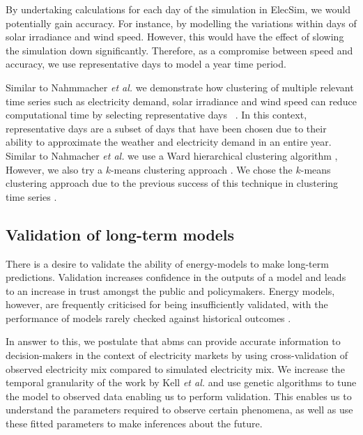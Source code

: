 By undertaking calculations for each day of the simulation in ElecSim, we would potentially gain accuracy. For instance, by modelling the variations within days of solar irradiance and wind speed. However, this would have the effect of slowing the simulation down significantly. Therefore, as a compromise between speed and accuracy, we use representative days to model a year time period. 

Similar to Nahmmacher \textit{et al.} we demonstrate how clustering of multiple relevant time series such as electricity demand, solar irradiance and wind speed can reduce computational time by selecting representative days ~\cite{Nahmmacher2016}. In this context, representative days are a subset of days that have been chosen due to their ability to approximate the weather and electricity demand in an entire year. Similar to Nahmacher \textit{et al.} we use a Ward hierarchical clustering algorithm  \cite{doi:10.1080/01621459.1963.10500845}, However, we also try a $k$-means clustering approach \cite{forgy65}. We chose the $k$-means clustering approach due to the previous success of this technique in clustering time series \cite{Kell2018a}. 



\subsection{Validation of long-term models}

There is a desire to validate the ability of energy-models to make long-term predictions. Validation increases confidence in the outputs of a model and leads to an increase in trust amongst the public and policymakers. Energy models, however, are frequently criticised for being insufficiently validated, with the performance of models rarely checked against historical outcomes \cite{Beckman2011}.

In answer to this, we postulate that \acrshort{abm}s can provide accurate information to decision-makers in the context of electricity markets by using cross-validation of observed electricity mix compared to simulated electricity mix. We increase the temporal granularity of the work by Kell \textit{et al.} \cite{Kell} and use genetic algorithms to tune the model to observed data enabling us to perform validation. This enables us to understand the parameters required to observe certain phenomena, as well as use these fitted parameters to make inferences about the future. 




